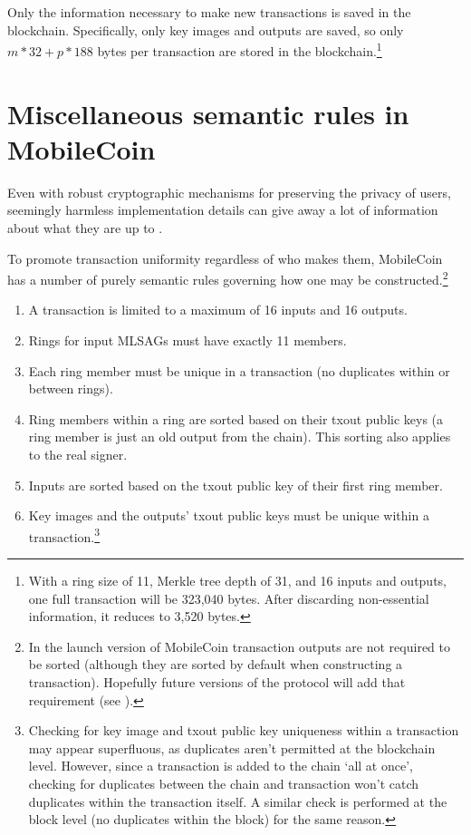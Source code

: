 Only the information necessary to make new transactions is saved in the blockchain. Specifically, only key images and outputs are saved, so only $m*32 + p*188$ bytes per transaction are stored in the blockchain.\footnote{With a ring size of 11, Merkle tree depth of 31, and 16 inputs and outputs, one full transaction will be 323,040 bytes. After discarding non-essential information, it reduces to 3,520 bytes.}

\section{Miscellaneous semantic rules in MobileCoin}
\label{sec:misc-semantic-rules}

Even with robust cryptographic mechanisms for preserving the privacy of users, seemingly harmless implementation details can give away a lot of information about what they are up to \cite{monero-tx-extra-statistics,update-tx-supplement-proposal-monero}.

To promote transaction uniformity regardless of who makes them, MobileCoin has a number of purely semantic rules governing how one may be constructed.\footnote{In the launch version of MobileCoin transaction outputs are not required to be sorted (although they are sorted by default when constructing a transaction). Hopefully future versions of the protocol will add that requirement (see \cite{mc-pull-request-validate-sorted-outputs-in-tx}).}

\begin{enumerate}
    \item A transaction is limited to a maximum of 16 inputs and 16 outputs.
    \item Rings for input MLSAGs must have exactly 11 members.
    \item Each ring member must be unique in a transaction (no duplicates within or between rings).
    \item Ring members within a ring are sorted based on their txout public keys (a ring member is just an old output from the chain). This sorting also applies to the real signer.
    \item Inputs are sorted based on the txout public key of their first ring member.
    \item Key images and the outputs' txout public keys must be unique within a transaction.\footnote{Checking for key image and txout public key uniqueness within a transaction may appear superfluous, as duplicates aren't permitted at the blockchain level. However, since a transaction is added to the chain `all at once', checking for duplicates between the chain and transaction won't catch duplicates within the transaction itself. A similar check is performed at the block level (no duplicates within the block) for the same reason.}
\end{enumerate}



